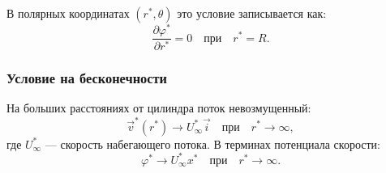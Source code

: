 	В полярных координатах $(r^*, \theta)$ это условие записывается как:
	\[
	\frac{\partial \varphi^*}{\partial r^*} = 0 \quad \text{при} \quad r^* = R.
	\]
	
	\subsubsection{Условие на бесконечности}
	На больших расстояниях от цилиндра поток невозмущенный:
	\[
	\vec{v}^*(r^*) \to U_\infty^* \vec{i} \quad \text{при} \quad r^* \to \infty,
	\]
	где $U_\infty^*$ — скорость набегающего потока. В терминах потенциала скорости:
	\[
	\varphi^* \to U_\infty^* x^* \quad \text{при} \quad r^* \to \infty.
	\]
